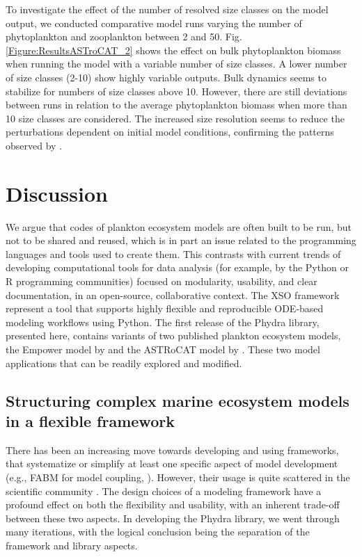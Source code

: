 \documentclass[journal abbreviation, manuscript]{copernicus}
\begin{document}
To investigate the effect of the number of resolved size classes on the model output, we conducted comparative model runs varying the number of phytoplankton and zooplankton between 2 and 50.
Fig. \ref{Figure:ResultsASTroCAT_2} shows the effect on bulk phytoplankton biomass when running the model with a variable number of size classes. A lower number of size classes (2-10) show highly variable outputs. Bulk dynamics seems to stabilize for numbers of size classes above 10. However, there are still deviations between runs in relation to the average phytoplankton biomass when more than 10 size classes are considered. The increased size resolution seems to reduce the perturbations dependent on initial model conditions, confirming the patterns observed by \citet{Baird2010IncreasingErrors}.



\section{Discussion}

We argue that codes of plankton ecosystem models are often built to be run, but not to be shared and reused, which is in part an issue related to the programming languages and tools used to create them. This contrasts with current trends of developing computational tools for data analysis (for example, by the Python or R programming communities) focused on modularity, usability, and clear documentation, in an open-source, collaborative context. 
The XSO framework represent a tool that supports highly flexible and reproducible ODE-based modeling workflows using Python. The first release of the Phydra library, presented here, contains variants of two published plankton ecosystem models, the Empower model by \citet{Anderson2015c} and the ASTRoCAT model by \citet{Banas2011b}. These two model applications that can be readily explored and modified.


\subsection{Structuring complex marine ecosystem models in a flexible framework}

There has been an increasing move towards developing and using frameworks, that systematize or simplify at least one specific aspect of model development (e.g., FABM for model coupling, \citet{Bruggeman2014a}). However, their usage is quite scattered in the scientific community \citep{Janssen2015ExploringPerspective}. The design choices of a modeling framework have a profound effect on both the flexibility and usability, with an inherent trade-off between these two aspects. In developing the Phydra library, we went through many iterations, with the logical conclusion being the separation of the framework and library aspects.
\end{document}
